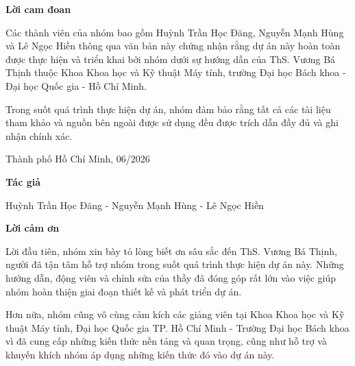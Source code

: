 \newpage





\thispagestyle{empty}
{\Huge \bfseries {Lời cam đoan}}
\vspace{1cm}

Các thành viên của nhóm bao gồm Huỳnh Trần Học Đăng, Nguyễn Mạnh Hùng và Lê Ngọc Hiền thông qua văn bản này chứng nhận rằng dự án này hoàn toàn được thực hiện và triển khai bởi nhóm dưới sự hướng dẫn của ThS. Vương Bá Thịnh thuộc Khoa Khoa học và Kỹ thuật Máy tính, trường Đại học Bách khoa - Đại học Quốc gia - Hồ Chí Minh.

\bigskip

Trong suốt quá trình thực hiện dự án, nhóm đảm bảo rằng tất cả các tài liệu tham khảo và nguồn bên ngoài được sử dụng đều được trích dẫn đầy đủ và ghi nhận chính xác.

\vspace{2cm}

\begin{flushright}
Thành phố Hồ Chí Minh, 06/2026

\medskip

\textbf{Tác giả}

\medskip

Huỳnh Trần Học Đăng - Nguyễn Mạnh Hùng - Lê Ngọc Hiền
\end{flushright}

\newpage


\thispagestyle{empty}

\thispagestyle{empty}
{\Huge \bfseries {Lời cảm ơn}}
\vspace{1cm}

Lời đầu tiên, nhóm xin bày tỏ lòng biết ơn sâu sắc đến ThS. Vương Bá Thịnh, người đã tận tâm hỗ trợ nhóm trong suốt quá trình thực hiện dự án này. Những hướng dẫn, động viên và chỉnh sửa của thầy đã đóng góp rất lớn vào việc giúp nhóm hoàn thiện giai đoạn thiết kế và phát triển dự án.

\bigskip

Hơn nữa, nhóm cũng vô cùng cảm kích các giảng viên tại Khoa Khoa học và Kỹ thuật Máy tính, Đại học Quốc gia TP. Hồ Chí Minh - Trường Đại học Bách khoa vì đã cung cấp những kiến thức nền tảng và quan trọng, cũng như hỗ trợ và khuyến khích nhóm áp dụng những kiến thức đó vào dự án này.

